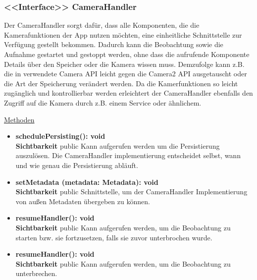 \subsubsection{<<Interface>> CameraHandler} \label{app:klasse:CameraHandler}
Der CameraHandler sorgt dafür, dass alle Komponenten, die die Kamerafunktionen der App nutzen möchten, eine einheitliche Schnittstelle zur Verfügung gestellt bekommen. Dadurch kann die Beobachtung sowie die Aufnahme gestartet und gestoppt werden, ohne dass die aufrufende Komponente Details über den Speicher oder die Kamera wissen muss. Demzufolge kann z.B. die in  verwendete Camera API leicht gegen die Camera2 API ausgetauscht oder die Art der Speicherung verändert werden. Da die Kamerfunktionen so leicht zugänglich und kontrollierbar werden erleichtert der CameraHandler ebenfalls den Zugriff auf die Kamera durch z.B. einem Service oder ähnlichem.
\newline

\underline{Methoden}
\begin{itemize}
\itemsep0pt

\item \textbf{schedulePersisting(): void}\hfill\\
\textbf{Sichtbarkeit} public\newline
Kann aufgerufen werden um die Persistierung auszulösen. Die CameraHandler implementierung entscheidet selbst, wann und wie genau die Persistierung abläuft.

\item \textbf{setMetadata (metadata: Metadata): void}\hfill\\
\textbf{Sichtbarkeit} public\newline
Schnittstelle, um der CameraHandler Implementierung von außen Metadaten übergeben zu können.

\item \textbf{resumeHandler(): void}\hfill\\
\textbf{Sichtbarkeit} public\newline
Kann aufgerufen werden, um die Beobachtung zu starten bzw. sie fortzusetzen, falls sie zuvor unterbrochen wurde.

\item \textbf{resumeHandler(): void}\hfill\\
\textbf{Sichtbarkeit} public\newline
Kann aufgerufen werden, um die Beobachtung zu unterbrechen.

\end{itemize}